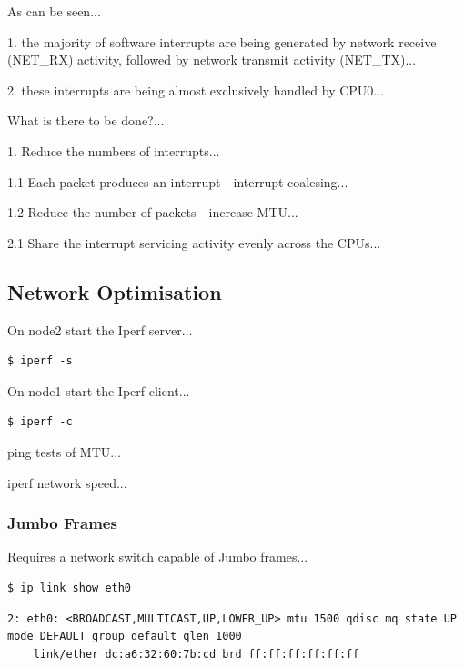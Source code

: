 \documentclass{report}
\begin{document}
As can be seen...

1. the majority of software interrupts are being generated by network receive (NET\_RX) activity, followed by network transmit activity (NET\_TX)...

2. these interrupts are being almost exclusively handled by CPU0...

What is there to be done?...

1. Reduce the numbers of interrupts...

1.1 Each packet produces an interrupt - interrupt coalesing...

1.2 Reduce the number of packets - increase MTU...

2.1 Share the interrupt servicing activity evenly across the CPUs...


%
%
\subsection{Network Optimisation}

On node2 start the Iperf server...

\lstset{style=termstyle}
\begin{lstlisting}
$ iperf -s
\end{lstlisting}

On node1 start the Iperf client...

\lstset{style=termstyle}
\begin{lstlisting}
$ iperf -c
\end{lstlisting}

ping tests of MTU...




iperf network speed...





\subsubsection{Jumbo Frames}

Requires a network switch capable of Jumbo frames...


\lstset{style=termstyle}
\begin{lstlisting}
$ ip link show eth0
\end{lstlisting}


\lstset{style=termstyle}
\begin{lstlisting}
2: eth0: <BROADCAST,MULTICAST,UP,LOWER_UP> mtu 1500 qdisc mq state UP mode DEFAULT group default qlen 1000
    link/ether dc:a6:32:60:7b:cd brd ff:ff:ff:ff:ff:ff
\end{lstlisting}
\end{document}
